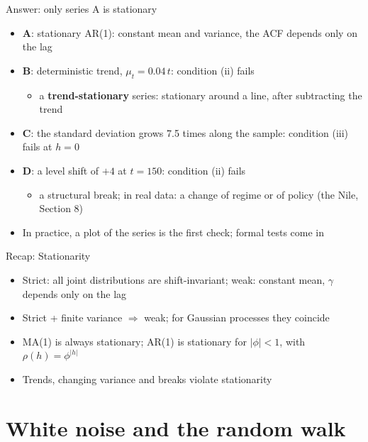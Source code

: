 \begin{frame}{Answer: only series A is stationary}
\itemsize{\small}
\begin{itemize}
    \item \textbf{A}: stationary AR(1): constant mean and variance, the ACF depends only on the lag
    \item \textbf{B}: deterministic trend, $\mu_t = 0.04\,t$: condition (ii) fails
    \begin{itemize}
        \item a \textbf{trend-stationary} series: stationary around a line, after subtracting the trend
    \end{itemize}
    \item \textbf{C}: the standard deviation grows 7.5 times along the sample: condition (iii) fails at $h = 0$
    \item \textbf{D}: a level shift of $+4$ at $t = 150$: condition (ii) fails
    \begin{itemize}
        \item a structural break; in real data: a change of regime or of policy (the Nile, Section 8)
    \end{itemize}
    \item In practice, a plot of the series is the first check; formal tests come in 
\end{itemize}
\end{frame}

\begin{frame}{Recap: Stationarity}
\itemsize{\small}
\begin{itemize}
    \item Strict: all joint distributions are shift-invariant; weak: constant mean, $\gamma$ depends only on the lag
    \item Strict + finite variance $\Rightarrow$ weak; for Gaussian processes they coincide
    \item MA(1) is always stationary; AR(1) is stationary for $|\phi| < 1$, with $\rho(h) = \phi^{|h|}$
    \item Trends, changing variance and breaks violate stationarity
\end{itemize}
\end{frame}


\section{White noise and the random walk}

